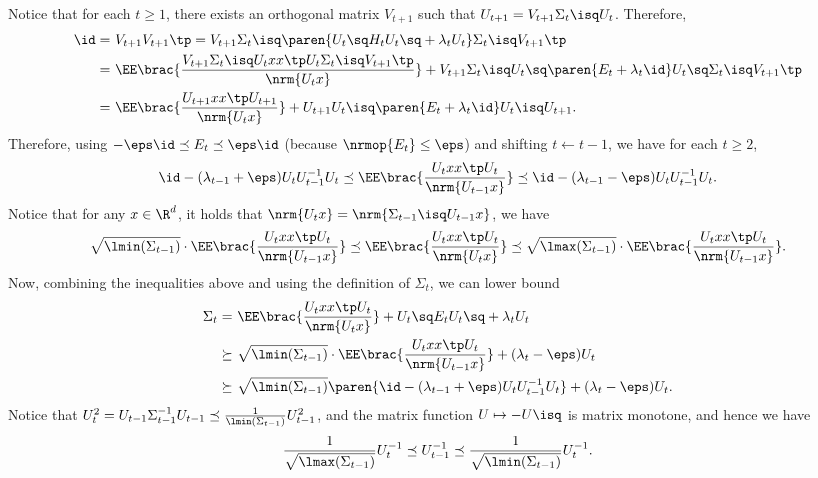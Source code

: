 Notice that for each $t\geq 1$, there exists an orthogonal matrix $V_{t+1}$ such that $U_{t+1}=V_{t+1}\Sigma_t\isq U_t$. Therefore,
\begin{align*}
    \id=&~V_{t+1}V_{t+1}\tp
    =V_{t+1} \Sigma_t\isq \paren{ U_t\sq H_t U_t\sq+\lambda_t U_t }\Sigma_t\isq V_{t+1}\tp \\
    =&~\EE\brac{ \frac{V_{t+1}\Sigma_t\isq U_t xx\tp U_t \Sigma_t\isq V_{t+1}\tp}{\nrm{U_tx}} }+V_{t+1} \Sigma_t\isq U_t\sq\paren{ E_t+\lambda_t\id }U_t\sq \Sigma_t\isq V_{t+1}\tp \\
    =&~ \EE\brac{ \frac{U_{t+1} xx\tp U_{t+1}}{\nrm{U_tx}} }+U_{t+1}U_{t}\isq \paren{ E_t+\lambda_t\id }U_t\isq U_{t+1}.
\end{align*}
Therefore, using $-\eps\id\preceq E_t\preceq \eps\id$ (because $\nrmop{E_t}\leq \eps$) and shifting $t\leftarrow t-1$, we have for each $t\geq 2$,
\begin{align*}
    \id-(\lambda_{t-1}+\eps)U_tU_{t-1}^{-1}U_{t} \preceq \EE\brac{ \frac{U_t xx\tp U_t}{\nrm{U_{t-1}x}} } \preceq \id-(\lambda_{t-1}-\eps)U_tU_{t-1}^{-1}U_{t}.
\end{align*}
Notice that for any $x\in\R^d$, it holds that $\nrm{U_tx}=\nrm{\Sigma_{t-1}\isq U_{t-1}x}$, we have
\begin{align*}
    \sqrt{ \lmin(\Sigma_{t-1}) }\cdot \EE\brac{ \frac{U_t xx\tp U_t}{\nrm{U_{t-1}x}} } \preceq
    \EE\brac{ \frac{U_t xx\tp U_t}{\nrm{U_tx}} } \preceq \sqrt{ \lmax(\Sigma_{t-1}) }\cdot \EE\brac{ \frac{U_t xx\tp U_t}{\nrm{U_{t-1}x}} }.
\end{align*}
Now, combining the inequalities above and using the definition of $\Sigma_t$, we can lower bound
\begin{align*}
    \Sigma_t=&~\EE\brac{ \frac{U_t xx\tp U_t}{\nrm{U_tx}} }+U_t\sq E_t U_t\sq+\lambda_t U_t \\
    \succeq&~ \sqrt{ \lmin(\Sigma_{t-1}) }\cdot \EE\brac{ \frac{U_t xx\tp U_t}{\nrm{U_{t-1}x}} } +(\lambda_t-\eps) U_t \\
    \succeq&~ \sqrt{ \lmin(\Sigma_{t-1}) }\paren{ \id-(\lambda_{t-1}+\eps)U_tU_{t-1}^{-1}U_{t} } +(\lambda_t-\eps) U_t.
\end{align*}
Notice that $U_t^2=U_{t-1}\Sigma_{t-1}^{-1}U_{t-1}\preceq \frac{1}{\lmin(\Sigma_{t-1})} U_{t-1}^2$, and the matrix function $U\mapsto -U\isq$ is matrix monotone, and hence we have
\begin{align*}
    \frac{1}{\sqrt{\lmax(\Sigma_{t-1})}} U_t^{-1} \preceq  U_{t-1}^{-1}\preceq \frac{1}{\sqrt{\lmin(\Sigma_{t-1})}} U_t^{-1}.
\end{align*}
